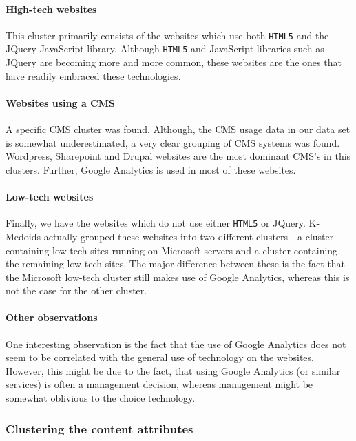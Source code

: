 \paragraph{High-tech websites}

This cluster primarily consists of the websites which use both \texttt{HTML5} and the JQuery JavaScript library. Although \texttt{HTML5} and JavaScript libraries such as JQuery are becoming more and more common, these websites are the ones that have readily embraced these technologies.

\paragraph{Websites using a CMS}

A specific CMS cluster was found. Although, the CMS usage data in our data set is somewhat underestimated, a very clear grouping of CMS systems was found. Wordpress, Sharepoint and Drupal websites are the most dominant CMS's in this clusters. Further, Google Analytics is used in most of these websites.

\paragraph{Low-tech websites}

Finally, we have the websites which do not use either \texttt{HTML5} or JQuery. K-Medoids actually grouped these websites into two different clusters - a cluster containing low-tech sites running on Microsoft servers and a cluster containing the remaining low-tech sites. The major difference between these is the fact that the Microsoft low-tech cluster still makes use of Google Analytics, whereas this is not the case for the other cluster.

\paragraph{Other observations} 

One interesting observation is the fact that the use of Google Analytics does not seem to be correlated with the general use of technology on the websites. However, this might be due to the fact, that using Google Analytics (or similar services) is often a management decision, whereas management might be somewhat oblivious to the choice technology.

\subsubsection{Clustering the content attributes}

